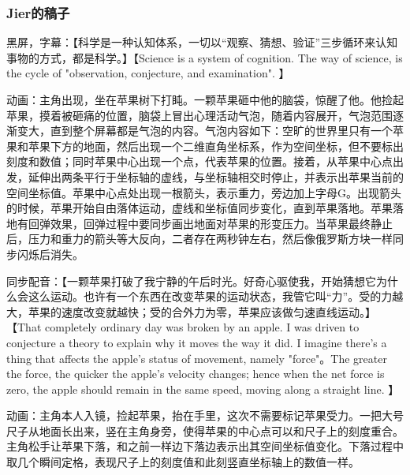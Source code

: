 
\begin{issues}
\issueDraft
\end{issues}


\subsubsection{Jier的稿子}



黑屏，字幕：【科学是一种认知体系，一切以“观察、猜想、验证”三步循环来认知事物的方式，都是科学。】【Science is a system of cognition. The way of science, is the cycle of "observation, conjecture, and examination". 】

动画：主角出现，坐在苹果树下打盹。一颗苹果砸中他的脑袋，惊醒了他。他捡起苹果，摸着被砸痛的位置，脑袋上冒出心理活动气泡，随着内容展开，气泡范围逐渐变大，直到整个屏幕都是气泡的内容。气泡内容如下：空旷的世界里只有一个苹果和苹果下方的地面，然后出现一个二维直角坐标系，作为空间坐标，但不要标出刻度和数值；同时苹果中心出现一个点，代表苹果的位置。接着，从苹果中心点出发，延伸出两条平行于坐标轴的虚线，与坐标轴相交时停止，并表示出苹果当前的空间坐标值。苹果中心点处出现一根箭头，表示重力，旁边加上字母G。出现箭头的时候，苹果开始自由落体运动，虚线和坐标值同步变化，直到苹果落地。苹果落地有回弹效果，回弹过程中要同步画出地面对苹果的形变压力。当苹果最终静止后，压力和重力的箭头等大反向，二者存在两秒钟左右，然后像俄罗斯方块一样同步闪烁后消失。

同步配音：【一颗苹果打破了我宁静的午后时光。好奇心驱使我，开始猜想它为什么会这么运动。也许有一个东西在改变苹果的运动状态，我管它叫“力”。受的力越大，苹果的速度改变就越快；受的合外力为零，苹果应该做匀速直线运动。】【That completely ordinary day was broken by an apple. I was driven to conjecture a theory to explain why it moves the way it did. I imagine there's a thing that affects the apple's status of movement, namely "force"。The greater the force, the quicker the apple's velocity changes; hence when the net force is zero, the apple should remain in the same speed, moving along a straight line. 】






动画：主角本人入镜，捡起苹果，抬在手里，这次不需要标记苹果受力。一把大号尺子从地面长出来，竖在主角身旁，使得苹果的中心点可以和尺子上的刻度重合。主角松手让苹果下落，和之前一样边下落边表示出其空间坐标值变化。下落过程中取几个瞬间定格，表现尺子上的刻度值和此刻竖直坐标轴上的数值一样。


